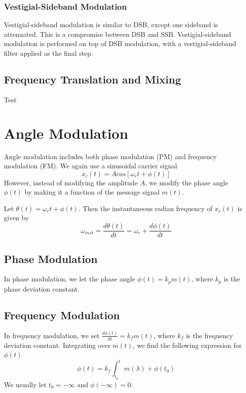 \documentclass[]{article}
\begin{document}
\subsubsection{Vestigial-Sideband Modulation}
Vestigial-sideband modulation is similar to DSB, except one sideband is attenuated. This is a compromise between DSB and SSB. Vestigial-sideband modulation is performed on top of DSB modulation, with a vestigial-sideband filter applied as the final step.
\subsection{Frequency Translation and Mixing}
Test

\newpage
\section{Angle Modulation}
Angle modulation includes both phase modulation (PM) and frequency modulation (FM). We again use a sinusoidal carrier signal 
\begin{equation}x_{c}(t) = Acos[\omega_{c}t+\phi(t)] \label{message_signal_sinusoidal_mod}\end{equation}
However, instead of modifying the amplitude $A$, we modify the phase angle $\phi(t)$ by making it a function of the message signal $m(t)$.


Let $\theta(t) = \omega_{c}t+\phi(t)$. Then the instantaneous radian frequency of $x_{c}(t)$ is given by 
\begin{equation} \omega_{inst} = \frac{d \theta(t)}{dt} = \omega_{c}+ \frac{d \phi(t)}{dt} \end{equation} 
\subsection{Phase Modulation}
In phase modulation, we let the phase angle $\phi(t) = k_{p}m(t)$, where $k_{p}$ is the phase deviation constant.
\subsection{Frequency Modulation}
In frequency modulation, we set $\frac{d\phi(t)}{dt} = k_{f}m(t)$, where $k_{f}$ is the frequency deviation constant. Integrating over $m(t)$, we find the following expression for $\phi(t)$
\begin{equation} \phi(t) = k_{f} \int_{t_{0}}^{t} m(\lambda) + \phi(t_{0}) \end{equation}
We usually let $t_{0} = -\infty$ and $\phi(-\infty)=0$.
\end{document}
